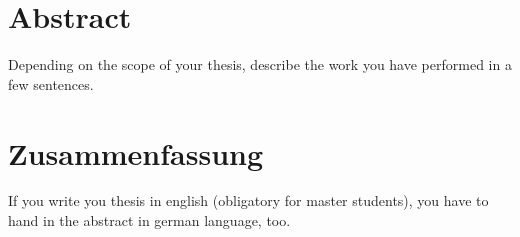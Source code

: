 \chapter*{Abstract}
Depending on the scope of your thesis, describe the work you have performed in a few sentences.

\newpage
\chapter*{Zusammenfassung}
If you write you thesis in english (obligatory for master students), you have to hand in the abstract in german language, too.
